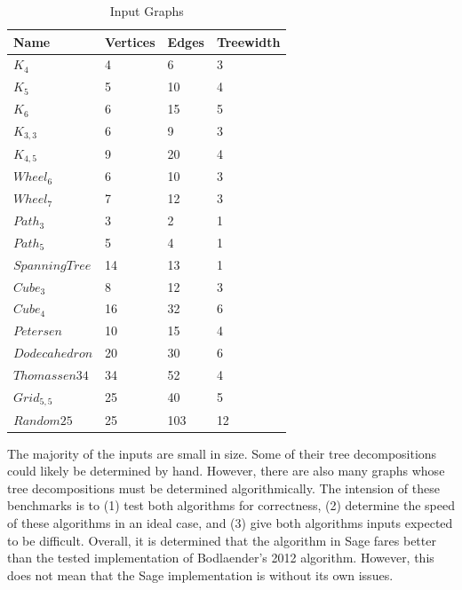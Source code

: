 \documentclass[12pt,conference]{IEEEtran}
\theoremstyle{plain}
\begin{document}
\begin{table}
\centering
\caption{Input Graphs}
\label{graph-list}
\begin{tabular}{|l|l|l|l|}
\hline
 Name&Vertices  &Edges  &Treewidth\\ \hline
  $K_{4}$&  4&  6&  3\\ \hline
  $K_{5}$&  5&  10&  4\\ \hline
  $K_{6}$&  6&  15&  5\\ \hline
  $K_{3,3}$&  6&  9& 3 \\ \hline
  $K_{4,5}$&  9&  20& 4 \\ \hline
  $Wheel_{6}$&  6&  10& 3 \\ \hline
  $Wheel_{7}$&  7&  12& 3 \\ \hline
  $Path_{3}$&  3&  2&  1\\ \hline
  $Path_{5}$&  5&  4&  1\\ \hline
  $Spanning Tree$&  14&  13& 1 \\ \hline
  $Cube_{3}$&  8&  12&  3\\ \hline
  $Cube_{4}$&  16&  32&  6\\ \hline
  $Petersen$&  10&  15&  4\\ \hline
  $Dodecahedron$&  20&  30& 6 \\ \hline
  $Thomassen34$&  34&  52&  4\\ \hline
  $Grid_{5,5}$&  25&  40&  5\\ \hline
  $Random25$&  25&  103&  12\\ \hline
\end{tabular}
\end{table}

The majority of the inputs are small in size. Some of their tree decompositions could likely be determined by hand. However, there are also many graphs whose tree decompositions must be determined algorithmically. The intension of these benchmarks is to (1) test both algorithms for correctness, (2) determine the speed of these algorithms in an ideal case, and (3) give both algorithms inputs expected to be difficult. Overall, it is determined that the algorithm in Sage fares better than the tested implementation of Bodlaender's 2012 algorithm. However, this does not mean that the Sage implementation is without its own issues.
\end{document}
